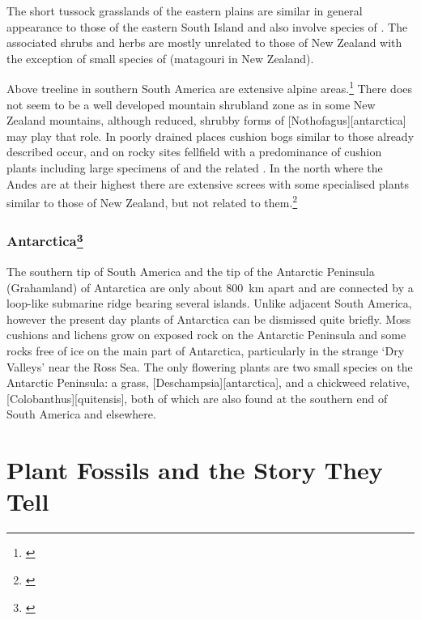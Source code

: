 The short tussock grasslands of the eastern plains are similar in general appearance to those of the eastern South Island and also involve species of .
The associated shrubs and herbs are mostly unrelated to those of New Zealand with the exception of small species of  (matagouri in New Zealand).

Above treeline in southern South America are extensive alpine areas.\footnote{\cite{moore1975alpine}}
There does not seem to be a well developed mountain shrubland zone as in some New Zealand mountains, although reduced, shrubby forms of [Nothofagus][antarctica] may play that role.
In poorly drained places cushion bogs similar to those already described occur, and on rocky sites fellfield with a predominance of cushion plants including large specimens of  and the related .
In the north where the Andes are at their highest there are extensive screes with some specialised plants similar to those of New Zealand, but not related to them.\footnote{\cite{goodspeed1950plant}}

\subsection[Antarctica]{Antarctica\thinspace\footnote{\cite{wace1965vascular}}}

The southern tip of South America and the tip of the Antarctic Peninsula (Grahamland) of Antarctica are only about \SI{800}{\kilo\metre} apart and are connected by a loop-like submarine ridge bearing several islands.
Unlike adjacent South America, however the present day plants of Antarctica can be dismissed quite briefly.
Moss cushions and lichens grow on exposed rock on the Antarctic Peninsula and some rocks free of ice on the main part of Antarctica, particularly in the strange `Dry Valleys' near the Ross Sea.
The only flowering plants are two small species on the Antarctic Peninsula: a grass, [Deschampsia][antarctica], and a chickweed relative, [Colobanthus][quitensis], both of which are also found at the southern end of South America and elsewhere.

\chapter{Plant Fossils and the Story They Tell}


